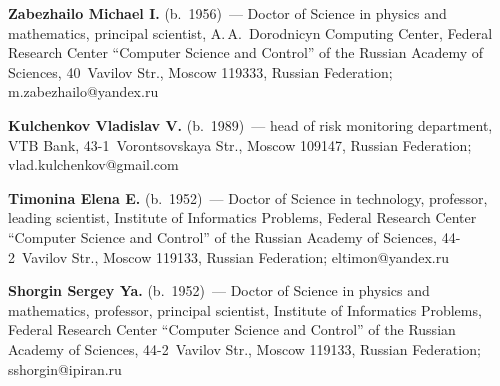 \vspace*{3pt}

\noindent
\textbf{Zabezhailo Michael I.} (b.\ 1956)~--- Doctor of Science in physics and mathematics, principal 
scientist, A.\,A.~Dorodnicyn Computing Center, Federal Research Center ``Computer Science and 
Control'' of the Russian Academy of Sciences, 40~Vavilov Str., Moscow 119333, Russian Federation; 
\mbox{m.zabezhailo@yandex.ru}

\vspace*{3pt}

\noindent
\textbf{Kulchenkov Vladislav V.} (b.\ 1989)~--- head of risk monitoring department, VTB Bank,  
43-1~Vorontsovskaya Str., Moscow 109147, Russian Federation; 
\mbox{vlad.kulchenkov@gmail.com}

\vspace*{3pt}

\noindent
\textbf{Timonina Elena E.} (b.\ 1952)~--- Doctor of Science in technology, professor, leading scientist, 
Institute of Informatics Problems, Federal Research Center ``Computer Science and Control'' of the 
Russian Academy of Sciences, 44-2~Vavilov Str., Moscow 119133, Russian Federation; 
\mbox{eltimon@yandex.ru}

\vspace*{3pt}

\noindent
\textbf{Shorgin Sergey Ya.} (b.\ 1952)~--- Doctor of Science in physics and mathematics, professor, 
principal scientist, Institute of Informatics Problems, Federal Research Center ``Computer Science and 
Control'' of the Russian Academy of Sciences, 44-2~Vavilov Str., Moscow 119133, Russian 
Federation; \mbox{sshorgin@ipiran.ru}

   
\label{end\stat}

\renewcommand{\bibname}{\protect\rm Литература} 